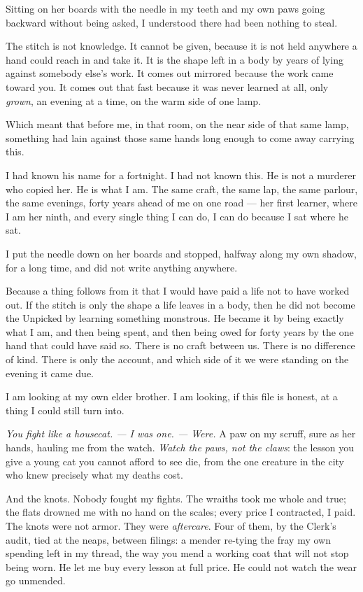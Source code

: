 Sitting on her boards with the needle in my teeth and my own paws going backward without being asked, I understood there had been nothing to steal.

The stitch is not knowledge. It cannot be given, because it is not held anywhere a hand could reach in and take it. It is the shape left in a body by years of lying against somebody else's work. It comes out mirrored because the work came toward you. It comes out that fast because it was never learned at all, only \emph{grown}, an evening at a time, on the warm side of one lamp.

Which meant that before me, in that room, on the near side of that same lamp, something had lain against those same hands long enough to come away carrying this.

I had known his name for a fortnight. I had not known this. He is not a murderer who copied her. He is what I am. The same craft, the same lap, the same parlour, the same evenings, forty years ahead of me on one road --- her first learner, where I am her ninth, and every single thing I can do, I can do because I sat where he sat.

I put the needle down on her boards and stopped, halfway along my own shadow, for a long time, and did not write anything anywhere.

Because a thing follows from it that I would have paid a life not to have worked out. If the stitch is only the shape a life leaves in a body, then he did not become the Unpicked by learning something monstrous. He became it by being exactly what I am, and then being spent, and then being owed for forty years by the one hand that could have said so. There is no craft between us. There is no difference of kind. There is only the account, and which side of it we were standing on the evening it came due.

I am looking at my own elder brother. I am looking, if this file is honest, at a thing I could still turn into.

\emph{You fight like a housecat. --- I was one. --- Were.} A paw on my scruff, sure as her hands, hauling me from the watch. \emph{Watch the paws, not the claws}: the lesson you give a young cat you cannot afford to see die, from the one creature in the city who knew precisely what my deaths cost.

And the knots. Nobody fought my fights. The wraiths took me whole and true; the flats drowned me with no hand on the scales; every price I contracted, I paid. The knots were not armor. They were \emph{aftercare}. Four of them, by the Clerk's audit, tied at the neaps, between filings: a mender re-tying the fray my own spending left in my thread, the way you mend a working coat that will not stop being worn. He let me buy every lesson at full price. He could not watch the wear go unmended.

